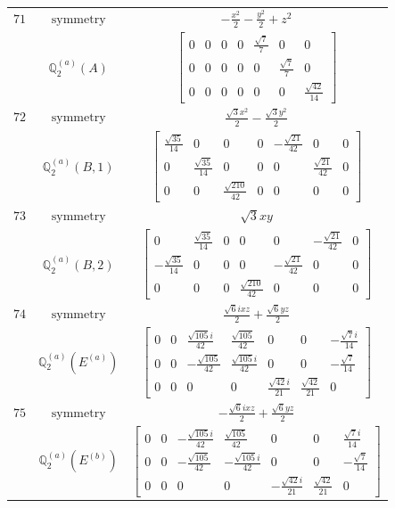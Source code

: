 \documentclass[fleqn,8pt,landscape]{jsarticle}
\begin{document}
\begin{longtable}{ccc}
$ 71 $ & $ \text{symmetry} $ & $ - \frac{x^{2}}{2} - \frac{y^{2}}{2} + z^{2} $ \\
$  $ & $ \mathbb{Q}_{2}^{(a)}(A) $ & $ \begin{bmatrix} 0 & 0 & 0 & 0 & \frac{\sqrt{7}}{7} & 0 & 0 \\ 0 & 0 & 0 & 0 & 0 & \frac{\sqrt{7}}{7} & 0 \\ 0 & 0 & 0 & 0 & 0 & 0 & \frac{\sqrt{42}}{14} \end{bmatrix} $ \\ \hline
$ 72 $ & $ \text{symmetry} $ & $ \frac{\sqrt{3} x^{2}}{2} - \frac{\sqrt{3} y^{2}}{2} $ \\
$  $ & $ \mathbb{Q}_{2}^{(a)}(B,1) $ & $ \begin{bmatrix} \frac{\sqrt{35}}{14} & 0 & 0 & 0 & - \frac{\sqrt{21}}{42} & 0 & 0 \\ 0 & \frac{\sqrt{35}}{14} & 0 & 0 & 0 & \frac{\sqrt{21}}{42} & 0 \\ 0 & 0 & \frac{\sqrt{210}}{42} & 0 & 0 & 0 & 0 \end{bmatrix} $ \\ \hline
$ 73 $ & $ \text{symmetry} $ & $ \sqrt{3} x y $ \\
$  $ & $ \mathbb{Q}_{2}^{(a)}(B,2) $ & $ \begin{bmatrix} 0 & \frac{\sqrt{35}}{14} & 0 & 0 & 0 & - \frac{\sqrt{21}}{42} & 0 \\ - \frac{\sqrt{35}}{14} & 0 & 0 & 0 & - \frac{\sqrt{21}}{42} & 0 & 0 \\ 0 & 0 & 0 & \frac{\sqrt{210}}{42} & 0 & 0 & 0 \end{bmatrix} $ \\ \hline
$ 74 $ & $ \text{symmetry} $ & $ \frac{\sqrt{6} i x z}{2} + \frac{\sqrt{6} y z}{2} $ \\
$  $ & $ \mathbb{Q}_{2}^{(a)}(E^{(a)}) $ & $ \begin{bmatrix} 0 & 0 & \frac{\sqrt{105} i}{42} & \frac{\sqrt{105}}{42} & 0 & 0 & - \frac{\sqrt{7} i}{14} \\ 0 & 0 & - \frac{\sqrt{105}}{42} & \frac{\sqrt{105} i}{42} & 0 & 0 & - \frac{\sqrt{7}}{14} \\ 0 & 0 & 0 & 0 & \frac{\sqrt{42} i}{21} & \frac{\sqrt{42}}{21} & 0 \end{bmatrix} $ \\ \hline
$ 75 $ & $ \text{symmetry} $ & $ - \frac{\sqrt{6} i x z}{2} + \frac{\sqrt{6} y z}{2} $ \\
$  $ & $ \mathbb{Q}_{2}^{(a)}(E^{(b)}) $ & $ \begin{bmatrix} 0 & 0 & - \frac{\sqrt{105} i}{42} & \frac{\sqrt{105}}{42} & 0 & 0 & \frac{\sqrt{7} i}{14} \\ 0 & 0 & - \frac{\sqrt{105}}{42} & - \frac{\sqrt{105} i}{42} & 0 & 0 & - \frac{\sqrt{7}}{14} \\ 0 & 0 & 0 & 0 & - \frac{\sqrt{42} i}{21} & \frac{\sqrt{42}}{21} & 0 \end{bmatrix} $ \\ \hline

\end{longtable}
\end{document}
